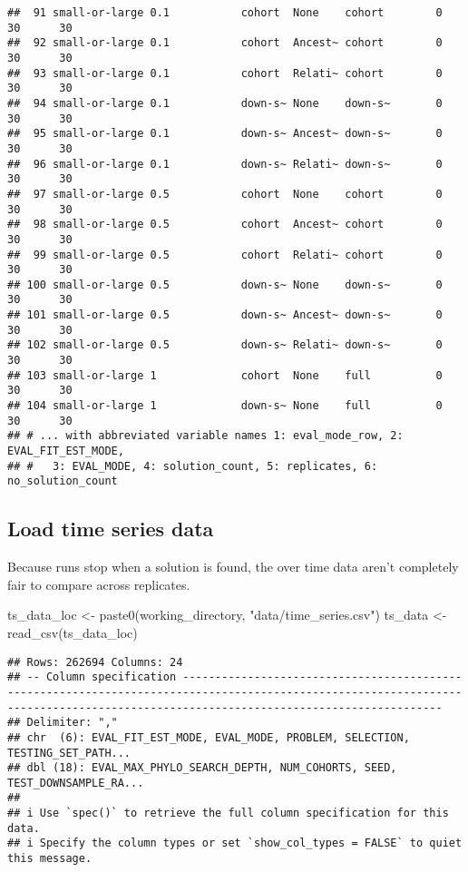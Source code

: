 \documentclass[
]{book}
\newenvironment{Shaded}{\begin{snugshade}}{\end{snugshade}}
\newcommand{\FunctionTok}[1]{\textcolor[rgb]{0.00,0.00,0.00}{#1}}
\newcommand{\NormalTok}[1]{#1}
\newcommand{\OtherTok}[1]{\textcolor[rgb]{0.56,0.35,0.01}{#1}}
\newcommand{\StringTok}[1]{\textcolor[rgb]{0.31,0.60,0.02}{#1}}
\begin{document}
\begin{verbatim}
##  91 small-or-large 0.1           cohort  None    cohort        0      30      30
##  92 small-or-large 0.1           cohort  Ancest~ cohort        0      30      30
##  93 small-or-large 0.1           cohort  Relati~ cohort        0      30      30
##  94 small-or-large 0.1           down-s~ None    down-s~       0      30      30
##  95 small-or-large 0.1           down-s~ Ancest~ down-s~       0      30      30
##  96 small-or-large 0.1           down-s~ Relati~ down-s~       0      30      30
##  97 small-or-large 0.5           cohort  None    cohort        0      30      30
##  98 small-or-large 0.5           cohort  Ancest~ cohort        0      30      30
##  99 small-or-large 0.5           cohort  Relati~ cohort        0      30      30
## 100 small-or-large 0.5           down-s~ None    down-s~       0      30      30
## 101 small-or-large 0.5           down-s~ Ancest~ down-s~       0      30      30
## 102 small-or-large 0.5           down-s~ Relati~ down-s~       0      30      30
## 103 small-or-large 1             cohort  None    full          0      30      30
## 104 small-or-large 1             down-s~ None    full          0      30      30
## # ... with abbreviated variable names 1: eval_mode_row, 2: EVAL_FIT_EST_MODE,
## #   3: EVAL_MODE, 4: solution_count, 5: replicates, 6: no_solution_count
\end{verbatim}

\hypertarget{load-time-series-data}{%
\subsection{Load time series data}\label{load-time-series-data}}

Because runs stop when a solution is found, the over time data aren't completely fair to compare across replicates.

\begin{Shaded}
\begin{Highlighting}[]
\NormalTok{ts\_data\_loc }\OtherTok{\textless{}{-}} \FunctionTok{paste0}\NormalTok{(working\_directory, }\StringTok{"data/time\_series.csv"}\NormalTok{)}
\NormalTok{ts\_data }\OtherTok{\textless{}{-}} \FunctionTok{read\_csv}\NormalTok{(ts\_data\_loc)}
\end{Highlighting}
\end{Shaded}

\begin{verbatim}
## Rows: 262694 Columns: 24
## -- Column specification ------------------------------------------------------------------------------------------------------------------------------------------------------------------------------------
## Delimiter: ","
## chr  (6): EVAL_FIT_EST_MODE, EVAL_MODE, PROBLEM, SELECTION, TESTING_SET_PATH...
## dbl (18): EVAL_MAX_PHYLO_SEARCH_DEPTH, NUM_COHORTS, SEED, TEST_DOWNSAMPLE_RA...
## 
## i Use `spec()` to retrieve the full column specification for this data.
## i Specify the column types or set `show_col_types = FALSE` to quiet this message.
\end{verbatim}
\end{document}
